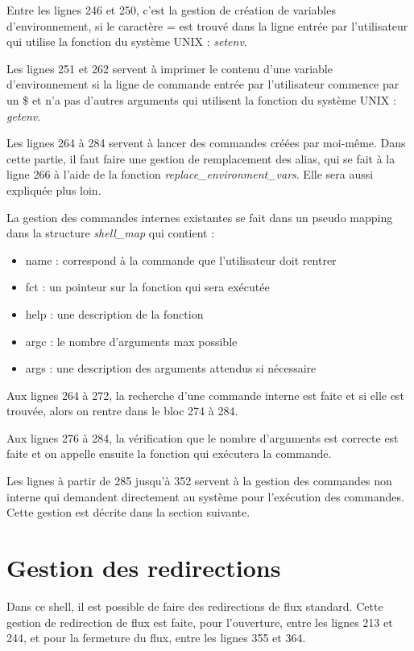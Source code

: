 \documentclass[a4paper,10pt]{article}
\begin{document}
Entre les lignes 246 et 250, c'est la gestion de création de variables d'environnement, si le caractère = est trouvé dans la ligne entrée par l'utilisateur qui utilise la fonction du système UNIX : \emph{setenv}.

Les lignes 251 et 262 servent à imprimer le contenu d'une variable d'environnement si la ligne de commande entrée par l'utilisateur commence par un \$ et n'a pas d'autres arguments qui utilisent la fonction du système UNIX : \emph{getenv}.

Les lignes 264 à 284 servent à lancer des commandes créées par moi-même. Dans cette partie, il faut faire une gestion de remplacement des alias, qui se fait à la ligne 266 à l'aide de la fonction \emph{replace\_environment\_vars}. Elle sera aussi expliquée plus loin.

La gestion des commandes internes existantes se fait dans un pseudo mapping dans la structure \emph{shell\_map} qui contient :
\begin{itemize}
	\item name : correspond à la commande que l'utilisateur doit rentrer
	\item fct : un pointeur sur la fonction qui sera exécutée
	\item help : une description de la fonction
	\item argc : le nombre d'arguments max possible
	\item args : une description des arguments attendus si nécessaire
\end{itemize}

Aux lignes 264 à 272, la recherche d'une commande interne est faite et si elle est trouvée, alors on rentre dans le bloc 274 à 284.

Aux lignes 276 à 284, la vérification que le nombre d'arguments est correcte est faite et on appelle ensuite la fonction qui exécutera la commande.

Les lignes à partir de 285 jusqu'à 352 servent à la gestion des commandes non interne qui demandent directement au système pour l'exécution des commandes. Cette gestion est décrite dans la section suivante.

\section{Gestion des redirections}
Dans ce shell, il est possible de faire des redirections de flux standard. Cette gestion de redirection de flux est faite, pour l'ouverture, entre les lignes 213 et 244, et pour la fermeture du flux, entre les lignes 355 et 364.
\end{document}
